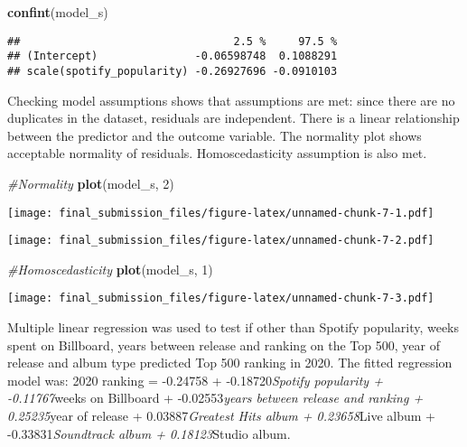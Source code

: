 \documentclass[
]{article}
\newenvironment{Shaded}{\begin{snugshade}}{\end{snugshade}}
\newcommand{\CommentTok}[1]{\textcolor[rgb]{0.56,0.35,0.01}{\textit{#1}}}
\newcommand{\DecValTok}[1]{\textcolor[rgb]{0.00,0.00,0.81}{#1}}
\newcommand{\FunctionTok}[1]{\textcolor[rgb]{0.13,0.29,0.53}{\textbf{#1}}}
\newcommand{\NormalTok}[1]{#1}
\newcommand{\SpecialCharTok}[1]{\textcolor[rgb]{0.81,0.36,0.00}{\textbf{#1}}}
\begin{document}
\begin{Shaded}
\begin{Highlighting}[]
\FunctionTok{confint}\NormalTok{(model\_s)}
\end{Highlighting}
\end{Shaded}

\begin{verbatim}
##                                 2.5 %     97.5 %
## (Intercept)               -0.06598748  0.1088291
## scale(spotify_popularity) -0.26927696 -0.0910103
\end{verbatim}

Checking model assumptions shows that assumptions are met: since there
are no duplicates in the dataset, residuals are independent. There is a
linear relationship between the predictor and the outcome variable. The
normality plot shows acceptable normality of residuals. Homoscedasticity
assumption is also met.

\begin{Shaded}
\begin{Highlighting}[]
\CommentTok{\#Normality}
\FunctionTok{plot}\NormalTok{(model\_s, }\DecValTok{2}\NormalTok{)}
\end{Highlighting}
\end{Shaded}

\texttt{[image: final\_submission\_files/figure-latex/unnamed-chunk-7-1.pdf]}

\begin{Shaded}
\end{Shaded}

\texttt{[image: final\_submission\_files/figure-latex/unnamed-chunk-7-2.pdf]}

\begin{Shaded}
\begin{Highlighting}[]
\CommentTok{\#Homoscedasticity}
\FunctionTok{plot}\NormalTok{(model\_s, }\DecValTok{1}\NormalTok{)}
\end{Highlighting}
\end{Shaded}

\texttt{[image: final\_submission\_files/figure-latex/unnamed-chunk-7-3.pdf]}

Multiple linear regression was used to test if other than Spotify
popularity, weeks spent on Billboard, years between release and ranking
on the Top 500, year of release and album type predicted Top 500 ranking
in 2020. The fitted regression model was: 2020 ranking = -0.24758 +
-0.18720\emph{Spotify popularity + -0.11767}weeks on Billboard +
-0.02553\emph{years between release and ranking + 0.25235}year of
release + 0.03887\emph{Greatest Hits album + 0.23658}Live album +
-0.33831\emph{Soundtrack album + 0.18123}Studio album.
\end{document}

